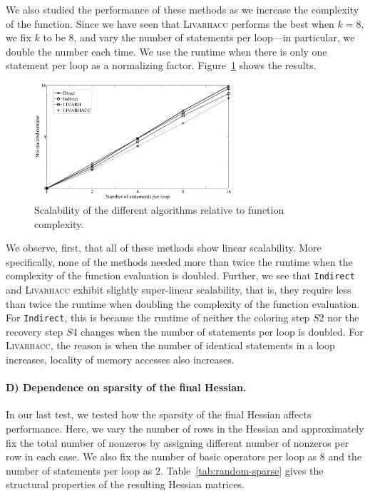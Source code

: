 \documentclass[11pt, twocolumn]{article}
\begin{document}
{We also studied the performance of these methods as we increase the complexity of the function. Since we have seen that \textsc{Livarhacc} performs the best when $k=8$, we fix $k$ to be $8$, and vary the number of statements per loop---in particular, we double the number each time. 
We use the runtime when there is only one statement per loop as a normalizing factor. 
Figure~\ref{fig:random-fig3} shows the results. 
\begin{figure}[htbp]
        \centering
        \includegraphics[width=0.65\textwidth]{figures/HRfig3BW}
        \caption[Scalability of the Different Algorithms Relative to Function Complexity]
                     {Scalability of the different algorithms relative to function complexity.}
        \label{fig:random-fig3}
\end{figure}

We observe, first, that all of these methods show linear scalability. More specifically, none of the methods needed more than twice the runtime when the complexity of the function evaluation is doubled. Further, we see that {\tt Indirect} and \textsc{Livarhacc} exhibit slightly super-linear scalability, that is, they require less than twice the runtime when doubling the complexity of the function evaluation. For {\tt Indirect}, this is because the runtime of neither the coloring step $S2$ nor the recovery step $S4$  changes when the number of statements per loop is doubled. For \textsc{Livarhacc}, the reason is when the number of identical statements in a loop increases, locality of memory accesses also increases. 


\paragraph{D) Dependence on sparsity of the final Hessian.}

In our last test, we tested how the sparsity of the final Hessian affects performance. Here, we vary the number of rows in the Hessian and approximately fix the total number of nonzeros by assigning different number of nonzeros per row in each case. We also fix the number of basic operators per loop as $8$ and the number of statements per loop as $2$. Table~\ref{tab:random-sparse} gives the structural properties of the resulting Hessian matrices.

}
\end{document}
